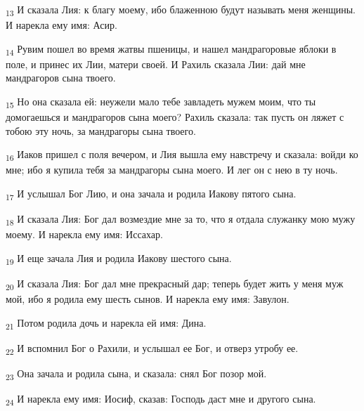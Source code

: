 \begin{tcolorbox}
\textsubscript{13} И сказала Лия: к благу моему, ибо блаженною будут называть меня женщины. И нарекла ему имя: Асир.
\end{tcolorbox}
\begin{tcolorbox}
\textsubscript{14} Рувим пошел во время жатвы пшеницы, и нашел мандрагоровые яблоки в поле, и принес их Лии, матери своей. И Рахиль сказала Лии: дай мне мандрагоров сына твоего.
\end{tcolorbox}
\begin{tcolorbox}
\textsubscript{15} Но она сказала ей: неужели мало тебе завладеть мужем моим, что ты домогаешься и мандрагоров сына моего? Рахиль сказала: так пусть он ляжет с тобою эту ночь, за мандрагоры сына твоего.
\end{tcolorbox}
\begin{tcolorbox}
\textsubscript{16} Иаков пришел с поля вечером, и Лия вышла ему навстречу и сказала: войди ко мне; ибо я купила тебя за мандрагоры сына моего. И лег он с нею в ту ночь.
\end{tcolorbox}
\begin{tcolorbox}
\textsubscript{17} И услышал Бог Лию, и она зачала и родила Иакову пятого сына.
\end{tcolorbox}
\begin{tcolorbox}
\textsubscript{18} И сказала Лия: Бог дал возмездие мне за то, что я отдала служанку мою мужу моему. И нарекла ему имя: Иссахар.
\end{tcolorbox}
\begin{tcolorbox}
\textsubscript{19} И еще зачала Лия и родила Иакову шестого сына.
\end{tcolorbox}
\begin{tcolorbox}
\textsubscript{20} И сказала Лия: Бог дал мне прекрасный дар; теперь будет жить у меня муж мой, ибо я родила ему шесть сынов. И нарекла ему имя: Завулон.
\end{tcolorbox}
\begin{tcolorbox}
\textsubscript{21} Потом родила дочь и нарекла ей имя: Дина.
\end{tcolorbox}
\begin{tcolorbox}
\textsubscript{22} И вспомнил Бог о Рахили, и услышал ее Бог, и отверз утробу ее.
\end{tcolorbox}
\begin{tcolorbox}
\textsubscript{23} Она зачала и родила сына, и сказала: снял Бог позор мой.
\end{tcolorbox}
\begin{tcolorbox}
\textsubscript{24} И нарекла ему имя: Иосиф, сказав: Господь даст мне и другого сына.
\end{tcolorbox}
